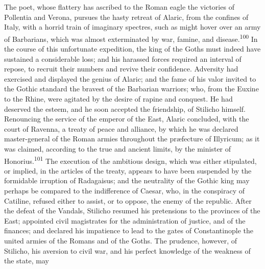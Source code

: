 

The poet, whose flattery has ascribed to the Roman eagle the
victories of Pollentia and Verona, pursues the hasty retreat of
Alaric, from the confines of Italy, with a horrid train of
imaginary spectres, such as might hover over an army of
Barbarians, which was almost exterminated by war, famine, and
disease.\textsuperscript{100} In the course of this unfortunate expedition, the
king of the Goths must indeed have sustained a considerable loss;
and his harassed forces required an interval of repose, to
recruit their numbers and revive their confidence. Adversity had
exercised and displayed the genius of Alaric; and the fame of his
valor invited to the Gothic standard the bravest of the Barbarian
warriors; who, from the Euxine to the Rhine, were agitated by the
desire of rapine and conquest. He had deserved the esteem, and he
soon accepted the friendship, of Stilicho himself. Renouncing the
service of the emperor of the East, Alaric concluded, with the
court of Ravenna, a treaty of peace and alliance, by which he was
declared master-general of the Roman armies throughout the
præfecture of Illyricum; as it was claimed, according to the
true and ancient limits, by the minister of Honorius.\textsuperscript{101} The
execution of the ambitious design, which was either stipulated,
or implied, in the articles of the treaty, appears to have been
suspended by the formidable irruption of Radagaisus; and the
neutrality of the Gothic king may perhaps be compared to the
indifference of Caesar, who, in the conspiracy of Catiline,
refused either to assist, or to oppose, the enemy of the
republic. After the defeat of the Vandals, Stilicho resumed his
pretensions to the provinces of the East; appointed civil
magistrates for the administration of justice, and of the
finances; and declared his impatience to lead to the gates of
Constantinople the united armies of the Romans and of the Goths.
The prudence, however, of Stilicho, his aversion to civil war,
and his perfect knowledge of the weakness of the state, may
